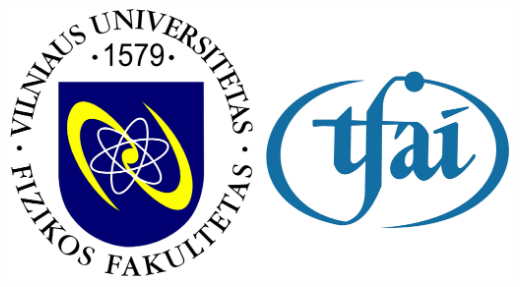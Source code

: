 \documentclass[a0,portrait]{a0poster}
\begin{document}
%
\hspace{1cm}
%
\begin{minipage}[b]{0.19\linewidth}
\begin{flushright}
\includegraphics[width=\linewidth]{VUFF-TFAI-logo.jpg}\\[0.8cm]$\phantom{x}$
\end{flushright}
\end{minipage}

\vspace{-0.8cm} 
\end{document}
